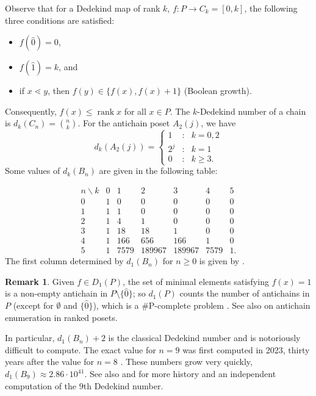 \documentclass[12pt]{amsart}
\numberwithin{equation}{section}
\theoremstyle{definition}
\newtheorem{remark}[theorem]{Remark}
\newcommand{\rank}{\operatorname{rank}}
\begin{document}
Observe that for a Dedekind map of rank $k$, $f \colon P \to C_k=[0,k]$, the following
three conditions are satisfied:
\begin{itemize}
\item $f(\hat 0) = 0$,
\item $f(\hat 1) = k$, and
\item if $x \lessdot y$, then $f(y) \in \{f(x),f(x)+1\}$ (Boolean growth).
\end{itemize}
Consequently, $f(x) \leq \rank x$ for all $x \in P$. The $k$-Dedekind
number of a chain is $d_k(C_n) = \binom n k$.  For the antichain poset
$A_{2}(j)$, we have
$$d_k(A_2(j)) = \left\{ \begin{array}{ccl} 1 & : & k = 0,2 \\ 2^j & : & k = 1 \\ 0 & : & k \geq 3. \end{array} \right. $$
Some values of $d_k(B_n)$ are given in the following table:

$$\begin{array}{c|cccccl}
   n \backslash k & 0 & 1 & 2 & 3 & 4 & 5  \\ \hline
   0 & 1 & 0 & 0 & 0 & 0 & 0 \\
   1 & 1 & 1 & 0 & 0 & 0 & 0 \\
   2 & 1 & 4 & 1 & 0 & 0 & 0 \\
   3 & 1 & 18 & 18 & 1 & 0 & 0 \\
   4 & 1 & 166 & 656 & 166 & 1 & 0 \\
   5 & 1 & 7579 & 189967 & 189967 & 7579 & 1.
  \end{array}$$
The first column determined by $d_1(B_n)$ for $n\geq 0$ is given by \cite[A007153]{oeis}.






\begin{remark}\label{rem:sharp.P}
Given $f \in D_1(P)$, the set of minimal elements satisfying $f(x) =
1$ is a non-empty antichain in $P \setminus \{\hat 0\}$; so $d_1(P)$
counts the number of antichains in $P$ (except for $\emptyset$ and
$\{\hat 0\}$), which is a \#P-complete problem \cite{antichains}.  See
also \cite{Sapozhenko} on antichain enumeration in ranked posets.

In particular, $d_1(B_n)+2$ is the classical Dedekind number and is
notoriously difficult to compute. The exact value for $n = 9$ was
first computed in 2023, thirty years after the value for $n=8$
\cite{JAKEL.2023}.  These numbers grow very quickly, $d_1(B_9) \approx
2.86 \cdot 10^{41}$.  See also \cite[A000372]{oeis} and
\cite{VanHirtum.dedekind9} for more history and an independent
computation of the $9$th Dedekind number.
\end{remark}
\end{document}
